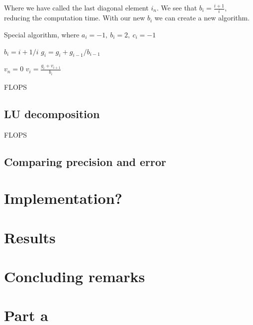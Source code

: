 \documentclass[american,a4paper,12pt]{article}
\begin{document}
Where we have called the last diagonal element $i_n$. We see that $b_i = \frac{i+1}{i}$, reducing the computation time. With our new $b_i$ we can create a new algorithm.
\begin{algorithm}
\caption{Special algorithm, where $a_i = -1,\ b_i = 2,\ c_i = -1$}
\begin{algorithmic}[1]
   
    \State $b_i = {i+1}/i$ 
    \State $g_i = g_i + {g}_{i-1}/{{b}_{i-1}}$ 
  \EndFor
    
  \Statex 
  \State $v_n = 0$ 
    \State $v_i = \frac{g_i + v_{i+1}}{b_i}$
  \EndFor
\end{algorithmic}
\end{algorithm}
FLOPS
\subsection{LU decomposition}
FLOPS
\subsection{Comparing precision and error}


\section{Implementation?}
\section{Results}
\section{Concluding remarks}








\section{Part a}
\end{document}
